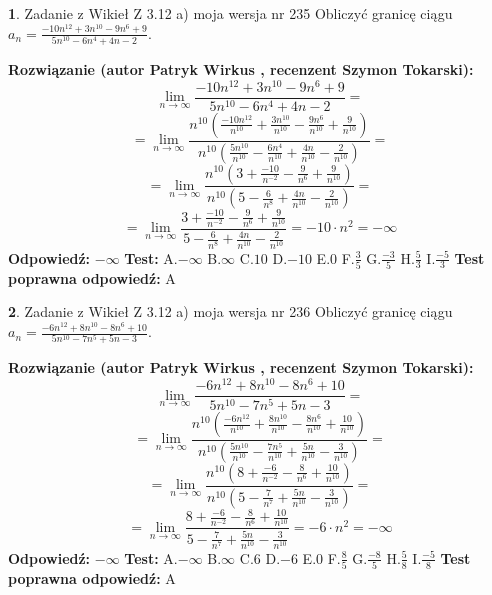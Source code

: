 \documentclass[12pt, a4paper]{article}
\theoremstyle{definition} %
\newtheorem{zad}{}
\newcommand{\zadStart}[1]{\begin{zad}#1\newline}
\newcommand{\zadStop}{\end{zad}}
\newcommand{\rozwStart}[2]{\noindent \textbf{Rozwiązanie (autor #1 , recenzent #2): }\newline}
\newcommand{\rozwStop}{\newline}
\newcommand{\odpStart}{\noindent \textbf{Odpowiedź:}\newline}
\newcommand{\odpStop}{\newline}
\newcommand{\testStart}{\noindent \textbf{Test:}\newline}
\newcommand{\testStop}{\newline}
\newcommand{\kluczStart}{\noindent \textbf{Test poprawna odpowiedź:}\newline}
\newcommand{\kluczStop}{\newline}
\begin{document}
\zadStart{Zadanie z Wikieł Z 3.12 a) moja wersja nr 235}
Obliczyć granicę ciągu $a_{n}=\frac{-10n^{12}+3n^{10}-9n^{6}+9}{5n^{10}-6n^{4}+4n-2}$.
\zadStop
\rozwStart{Patryk Wirkus}{Szymon Tokarski}
$$\lim\limits_{n\to\infty}\frac{-10n^{12}+3n^{10}-9n^{6}+9}{5n^{10}-6n^{4}+4n-2}=$$
$$=\lim\limits_{n\to\infty}\frac{n^{10}\left(\frac{-10n^{12}}{n^{10}}+\frac{3n^{10}}{n^{10}}-\frac{9n^{6}}{n^{10}}+\frac{9}{n^{10}}\right)}{n^{10}\left(\frac{5n^{10}}{n^{10}}-\frac{6n^{4}}{n^{10}}+\frac{4n}{n^{10}}-\frac{2}{n^{10}}\right)}=$$
$$=\lim\limits_{n\to\infty}\frac{n^{10}\left(3+\frac{-10}{n^{-2}}-\frac{9}{n^{6}}+\frac{9}{n^{10}}\right)}
{n^{10}\left(5-\frac{6}{n^{8}}+\frac{4n}{n^{10}}-\frac{2}{n^{10}}\right)}=$$
$$=\lim\limits_{n\to\infty}\frac{3+\frac{-10}{n^{-2}}-\frac{9}{n^{6}}+\frac{9}{n^{10}}}{5-\frac{6}{n^{8}}+\frac{4n}{n^{10}}-\frac{2}{n^{10}}}=-10\cdot n^{2} = -\infty$$
\rozwStop
\odpStart
$-\infty$
\odpStop
\testStart
A.$-\infty$
B.$\infty$
C.$10$
D.$-10$
E.$0$
F.$\frac{3}{5}$
G.$\frac{-3}{5}$
H.$\frac{5}{3}$
I.$\frac{-5}{3}$
\testStop
\kluczStart
A
\kluczStop



\zadStart{Zadanie z Wikieł Z 3.12 a) moja wersja nr 236}
Obliczyć granicę ciągu $a_{n}=\frac{-6n^{12}+8n^{10}-8n^{6}+10}{5n^{10}-7n^{5}+5n-3}$.
\zadStop
\rozwStart{Patryk Wirkus}{Szymon Tokarski}
$$\lim\limits_{n\to\infty}\frac{-6n^{12}+8n^{10}-8n^{6}+10}{5n^{10}-7n^{5}+5n-3}=$$
$$=\lim\limits_{n\to\infty}\frac{n^{10}\left(\frac{-6n^{12}}{n^{10}}+\frac{8n^{10}}{n^{10}}-\frac{8n^{6}}{n^{10}}+\frac{10}{n^{10}}\right)}{n^{10}\left(\frac{5n^{10}}{n^{10}}-\frac{7n^{5}}{n^{10}}+\frac{5n}{n^{10}}-\frac{3}{n^{10}}\right)}=$$
$$=\lim\limits_{n\to\infty}\frac{n^{10}\left(8+\frac{-6}{n^{-2}}-\frac{8}{n^{6}}+\frac{10}{n^{10}}\right)}
{n^{10}\left(5-\frac{7}{n^{7}}+\frac{5n}{n^{10}}-\frac{3}{n^{10}}\right)}=$$
$$=\lim\limits_{n\to\infty}\frac{8+\frac{-6}{n^{-2}}-\frac{8}{n^{6}}+\frac{10}{n^{10}}}{5-\frac{7}{n^{7}}+\frac{5n}{n^{10}}-\frac{3}{n^{10}}}=-6\cdot n^{2} = -\infty$$
\rozwStop
\odpStart
$-\infty$
\odpStop
\testStart
A.$-\infty$
B.$\infty$
C.$6$
D.$-6$
E.$0$
F.$\frac{8}{5}$
G.$\frac{-8}{5}$
H.$\frac{5}{8}$
I.$\frac{-5}{8}$
\testStop
\kluczStart
A
\kluczStop
\end{document}
